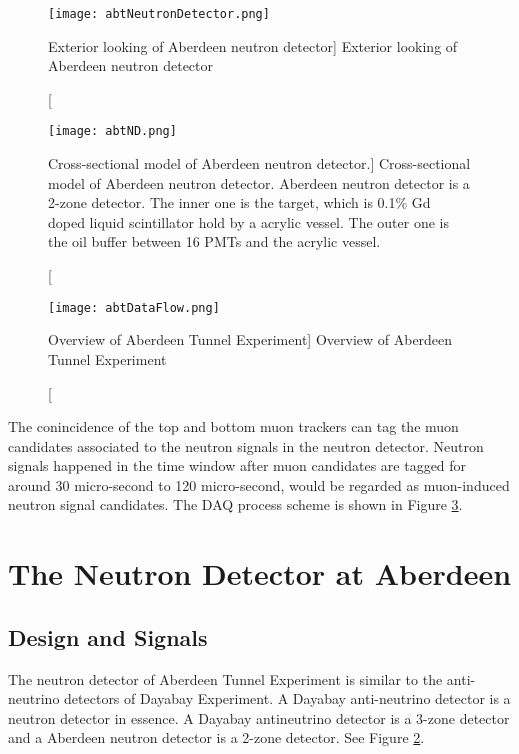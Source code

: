 \begin{figure}
    \centering
    \texttt{[image: abtNeutronDetector.png]}
    \caption
    [Exterior looking of Aberdeen neutron detector]
    {Exterior looking of Aberdeen neutron detector}
    \label{fig:abtNeutronDetector}
    \end{figure}

\begin{figure}
    \centering
    \texttt{[image: abtND.png]}
    \caption
    [Cross-sectional model of Aberdeen neutron detector.]
    {
Cross-sectional model of Aberdeen neutron detector.
Aberdeen neutron detector is a 2-zone detector. The inner one is the target, which is
0.1\% Gd doped liquid scintillator hold by a acrylic vessel.
The outer one is the oil buffer between 16 PMTs and the acrylic vessel.}
    \label{fig:abtND}
    \end{figure}


\begin{figure}
    \label{fig:abtDataFlow}
    \centering
    \texttt{[image: abtDataFlow.png]}
    \caption
    [Overview of Aberdeen Tunnel Experiment]
    {Overview of Aberdeen Tunnel Experiment}
    \end{figure}




The conincidence of the top and bottom muon trackers can tag the muon candidates
associated to the neutron signals in the neutron detector. Neutron signals happened
in the time window after muon candidates are tagged for around 30 micro-second to
120 micro-second, would be regarded as muon-induced neutron signal candidates.
The DAQ process scheme is shown in Figure \ref{fig:abtDataFlow}.




\section{The Neutron Detector at Aberdeen}
\label{sec:ND}
\subsection{Design and Signals}

The neutron detector of Aberdeen Tunnel Experiment is similar to the
anti-neutrino detectors of Dayabay Experiment. A Dayabay anti-neutrino
detector is a neutron detector in essence. A Dayabay antineutrino detector is a
3-zone detector and a Aberdeen neutron detector is a 2-zone detector. See
Figure \ref{fig:abtND}.


